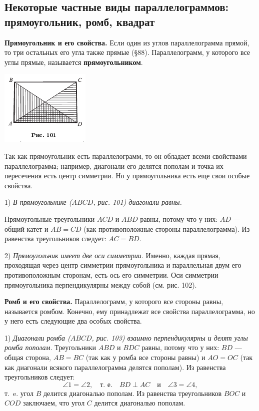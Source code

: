 \documentclass[oneside]{book}
\begin{document}
\subsection*{Некоторые частные виды параллелограммов:
прямоугольник, ромб, квадрат}

\textbf{Прямоугольник и его свойства.}
Если один из углов параллелограмма прямой, то три остальных его угла также прямые (§88).
Параллелограмм, у которого все углы прямые, называется \textbf{прямоугольником}.

\includegraphics{pics/ris-101}

Так как прямоугольник есть параллелограмм, то он обладает всеми свойствами параллелограмма;
например, диагонали его делятся пополам и точка их пересечения есть центр симметрии.
Но у прямоугольника есть еще свои особые свойства.

1) \emph{В прямоугольнике \emph{($ABCD$, рис. 101)} диагонали равны.}

Прямоугольные треугольники $ACD$ и $ABD$ равны, потому что у них:
$AD$ — общий катет и $AB=CD$ (как противоположные стороны параллелограмма).
Из равенства треугольников следует:
$AC = BD$.

2) \emph{Прямоугольник имеет две оси симметрии.}
Именно, каждая прямая, проходящая через центр симметрии прямоугольника и параллельная двум его противоположным сторонам, есть ось его симметрии.
Оси симметрии прямоугольника перпендикулярны между собой (см. рис. 102).

\textbf{Ромб и его свойства.}
Параллелограмм, у которого все стороны равны, называется ромбом.
Конечно, ему принадлежат все свойства параллелограмма, но у него есть следующие два особых свойства.

1) \emph{Диагонали ромба \emph{($ABCD$, рис. 103)} взаимно перпендикулярны и делят углы ромба пополам.}
Треугольники $ABD$ и $BDC$ равны, потому что у них:
$BD$ — общая сторона, $AB=BC$ (так как у ромба все стороны равны) и $AO=OC$ (так как диагонали всякого параллелограмма делятся пополам).
Из равенства треугольников следует:
\[\angle 1 =\angle 2,
\quad
\text{т.~е.}
\quad
BD\perp AC
\quad
\text{и}
\quad
\angle 3 =\angle 4,
\]
т.~e.
угол $B$ делится диагональю пополам.
Из равенства треугольников $BOC$ и $COD$ заключаем, что угол $C$ делится диагональю пополам.
\end{document}
